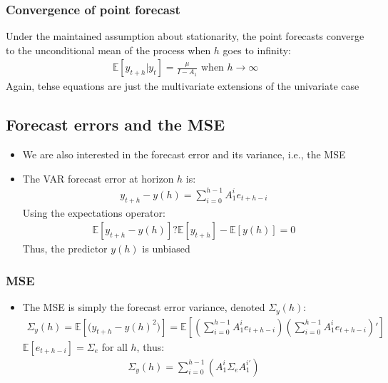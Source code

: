 \documentclass[10pt]{article}
\begin{document}
\subsubsection{Convergence of point forecast}
Under the maintained assumption about stationarity, the point forecasts converge to the unconditional mean of the process when $h $ goes to infinity: 
\begin{gather*}
    \mathbb{E}[y_{t + h}|y_t] = \frac{\mu}{I - A_1}\text{ when }h\to\infty
\end{gather*}
Again, tehse equations are just the multivariate extensions of the univariate case 
\newpage 
\subsection{Forecast errors and the MSE}
\begin{itemize}
    \item We are also interested in the forecast error and its variance, i.e., the MSE 
    \item The VAR forecast error at horizon $ h $ is:
    \begin{gather*}
        y_{t + h} - y(h) = \sum_{i = 0}^{h - 1}A_1^ie_{t + h - i}
    \end{gather*}
    Using the expectations operator: 
    \begin{gather*}
        \mathbb{E}[y_{t + h} - y(h)] ? \mathbb{E}[y_{t + h}] - \mathbb{E}[y(h)] = 0
    \end{gather*}
    Thus, the predictor $y(h) $ is unbiased 
\end{itemize}
\subsubsection{MSE}
\begin{itemize}
    \item The MSE is simply the forecast error variance, denoted $\Sigma_y(h) $:
    \begin{gather*}
        \Sigma_y(h) = \mathbb{E}\left[\big(y_{t + h} - y(h)^2\big)\right] = \mathbb{E}\left[\left(\sum_{i = 0}^{h - 1}A_1^ie_{t + h - i}\right)\left(\sum_{i = 0}^{h - 1}A_1^ie_{t + h - i}\right)'\right]
    \end{gather*}
    $\mathbb{E}[e_{t + h - i}] = \Sigma_e$ for all $h $, thus: 
    \begin{gather*}
        \Sigma_y(h) = \sum_{i = 0}^{h - 1}\left(A_1^i\Sigma_e A_1^{i\prime}\right)
    \end{gather*}
\end{itemize}
\end{document}
